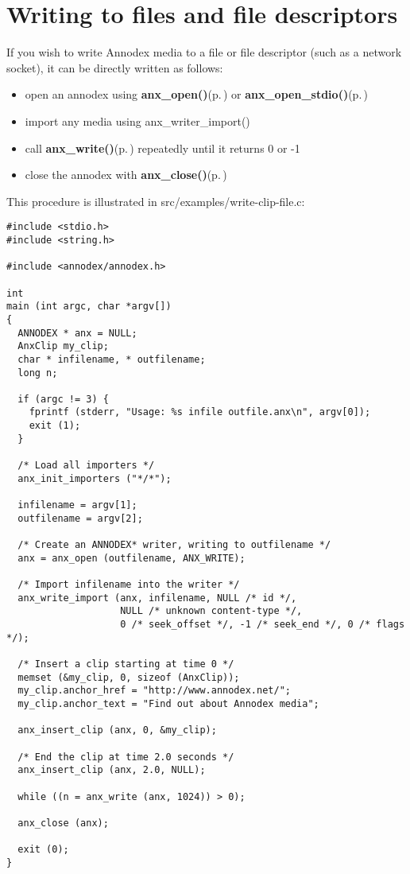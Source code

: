 \section{Writing to files and file descriptors}
\label{group__writing__files}
If you wish to write Annodex media to a file or file descriptor (such as a network socket), it can be directly written as follows:

\begin{itemize}
\item open an annodex using {\bf anx\_\-open()}{\rm (p.\,\pageref{anx__general_8h_a3})} or {\bf anx\_\-open\_\-stdio()}{\rm (p.\,\pageref{anx__general_8h_a4})}\item import any media using anx\_\-writer\_\-import()\item call {\bf anx\_\-write()}{\rm (p.\,\pageref{anx__write_8h_a10})} repeatedly until it returns 0 or -1\item close the annodex with {\bf anx\_\-close()}{\rm (p.\,\pageref{anx__general_8h_a7})}\end{itemize}


This procedure is illustrated in src/examples/write-clip-file.c:



\footnotesize\begin{verbatim}
#include <stdio.h>
#include <string.h>

#include <annodex/annodex.h>

int
main (int argc, char *argv[])
{
  ANNODEX * anx = NULL;
  AnxClip my_clip;
  char * infilename, * outfilename;
  long n;

  if (argc != 3) {
    fprintf (stderr, "Usage: %s infile outfile.anx\n", argv[0]);
    exit (1);
  }

  /* Load all importers */
  anx_init_importers ("*/*");

  infilename = argv[1];
  outfilename = argv[2];

  /* Create an ANNODEX* writer, writing to outfilename */
  anx = anx_open (outfilename, ANX_WRITE);

  /* Import infilename into the writer */
  anx_write_import (anx, infilename, NULL /* id */,
                    NULL /* unknown content-type */,
                    0 /* seek_offset */, -1 /* seek_end */, 0 /* flags */);

  /* Insert a clip starting at time 0 */
  memset (&my_clip, 0, sizeof (AnxClip));
  my_clip.anchor_href = "http://www.annodex.net/";
  my_clip.anchor_text = "Find out about Annodex media";

  anx_insert_clip (anx, 0, &my_clip);

  /* End the clip at time 2.0 seconds */
  anx_insert_clip (anx, 2.0, NULL);

  while ((n = anx_write (anx, 1024)) > 0);

  anx_close (anx);

  exit (0);
}
\end{verbatim}
\normalsize
 

